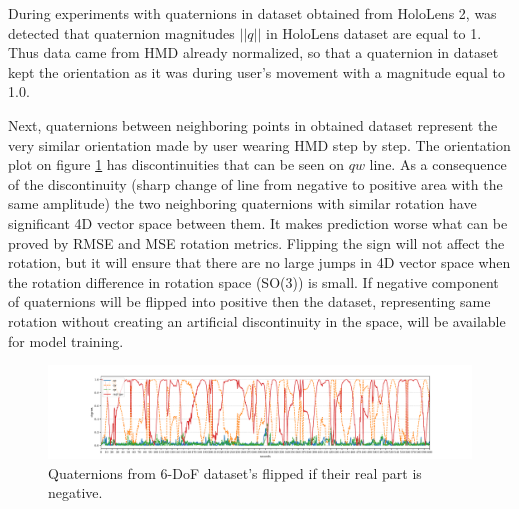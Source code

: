 During experiments with quaternions in dataset obtained from HoloLens 2, was detected that quaternion magnitudes $|| q ||$ in HoloLens dataset are equal to 1. Thus data came from HMD already normalized, so that a quaternion in dataset kept the orientation as it was during user's movement with a magnitude equal to 1.0.

Next, quaternions between neighboring points in obtained dataset represent the very similar orientation made by user wearing HMD step by step. The orientation plot on figure \ref{fig:norm_data} has discontinuities that can be seen on $qw$ line. As a consequence of the discontinuity (sharp change of line from negative to positive area with the same amplitude) the two neighboring quaternions with similar rotation have significant 4D vector space between them. It makes prediction worse what can be proved by RMSE and MSE rotation metrics. Flipping the sign will not affect the rotation, but it will ensure that there are no large jumps in 4D vector space when the rotation difference in rotation space (SO(3)) is small. If negative component of quaternions will be flipped into positive then the dataset, representing same rotation without creating an artificial discontinuity in the space, will be available for model training. 

\begin{figure}[htb]
	\begin{center}
		\includegraphics[width=1\textwidth, keepaspectratio]{gfx/Fig-1556-quaternions_flipped.pdf}
		\caption{\label{fig:norm_data} Quaternions from 6-DoF dataset's flipped if their real part is negative.}
	\end{center}
\end{figure}

